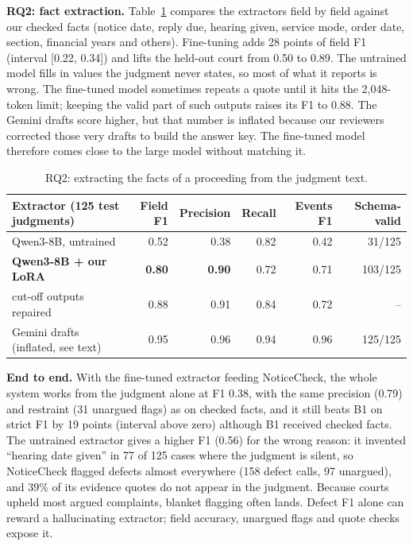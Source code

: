 \documentclass[10pt,a4paper]{article}
\begin{document}
\textbf{RQ2: fact extraction.} Table~\ref{tab:rq2} compares the extractors field by field against our checked facts (notice date, reply due, hearing given, service mode, order date, section, financial years and others). Fine-tuning adds 28 points of field F1 (interval [0.22, 0.34]) and lifts the held-out court from 0.50 to 0.89. The untrained model fills in values the judgment never states, so most of what it reports is wrong. The fine-tuned model sometimes repeats a quote until it hits the 2,048-token limit; keeping the valid part of such outputs raises its F1 to 0.88. The Gemini drafts score higher, but that number is inflated because our reviewers corrected those very drafts to build the answer key. The fine-tuned model therefore comes close to the large model without matching it.

\begin{table}[H]
\centering\small
\begin{tabular}{l rrr rr}
\toprule
Extractor (125 test judgments) & Field F1 & Precision & Recall & Events F1 & Schema-valid \\
\midrule
Qwen3-8B, untrained & 0.52 & 0.38 & 0.82 & 0.42 & 31/125 \\
\textbf{Qwen3-8B + our LoRA} & \textbf{0.80} & \textbf{0.90} & 0.72 & 0.71 & 103/125 \\
\quad cut-off outputs repaired & 0.88 & 0.91 & 0.84 & 0.72 & -- \\
Gemini drafts (inflated, see text) & 0.95 & 0.96 & 0.94 & 0.96 & 125/125 \\
\bottomrule
\end{tabular}
\caption{RQ2: extracting the facts of a proceeding from the judgment text.}
\label{tab:rq2}
\end{table}

\textbf{End to end.} With the fine-tuned extractor feeding NoticeCheck, the whole system works from the judgment alone at F1 0.38, with the same precision (0.79) and restraint (31 unargued flags) as on checked facts, and it still beats B1 on strict F1 by 19 points (interval above zero) although B1 received checked facts. The untrained extractor gives a higher F1 (0.56) for the wrong reason: it invented ``hearing date given'' in 77 of 125 cases where the judgment is silent, so NoticeCheck flagged defects almost everywhere (158 defect calls, 97 unargued), and 39\% of its evidence quotes do not appear in the judgment. Because courts upheld most argued complaints, blanket flagging often lands. Defect F1 alone can reward a hallucinating extractor; field accuracy, unargued flags and quote checks expose it.
\end{document}
